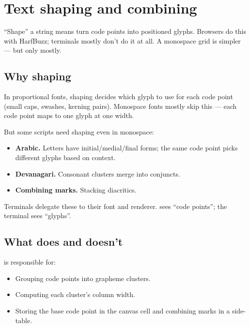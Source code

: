 \chapter{Text shaping and combining}
\label{ch:shaping}

\begin{aside}
``Shape'' a string means turn code points into positioned
glyphs. Browsers do this with HarfBuzz; terminals mostly don't
do it at all. A monospace grid is simpler --- but only mostly.
\end{aside}

\section{Why shaping}

In proportional fonts, shaping decides which glyph to use for
each code point (small caps, swashes, kerning pairs).
Monospace fonts mostly skip this --- each code point maps to
one glyph at one width.

But some scripts need shaping even in monospace:

\begin{itemize}[leftmargin=*]
  \item \textbf{Arabic.} Letters have initial/medial/final
    forms; the same code point picks different glyphs based
    on context.
  \item \textbf{Devanagari.} Consonant clusters merge into
    conjuncts.
  \item \textbf{Combining marks.} Stacking diacritics.
\end{itemize}

Terminals delegate these to their font and renderer. \maya{}
sees ``code points''; the terminal sees ``glyphs''.

\section{What \maya{} does and doesn't}

\maya{} is responsible for:

\begin{itemize}[leftmargin=*]
  \item Grouping code points into grapheme clusters.
  \item Computing each cluster's column width.
  \item Storing the base code point in the canvas cell and
    combining marks in a side-table.
\end{itemize}

